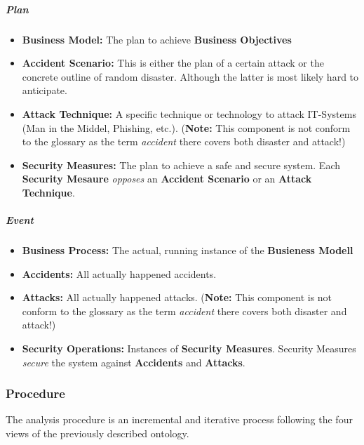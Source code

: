 \subparagraph{Plan}

\begin{itemize}
\itemsep1pt\parskip0pt
\item
  \textbf{Business Model:} The plan to achieve \textbf{Business
  Objectives}
\item
  \textbf{Accident Scenario:} This is either the plan of a certain
  attack or the concrete outline of random disaster. Although the latter
  is most likely hard to anticipate.
\item
  \textbf{Attack Technique:} A specific technique or technology to
  attack IT-Systems (Man in the Middel, Phishing, etc.). (\textbf{Note:}
  This component is not conform to the glossary as the term
  \emph{accident} there covers both disaster and attack!)
\item
  \textbf{Security Measures:} The plan to achieve a safe and secure
  system. Each \textbf{Security Mesaure} \emph{opposes} an
  \textbf{Accident Scenario} or an \textbf{Attack Technique}.
\end{itemize}

\subparagraph{Event}

\begin{itemize}
\itemsep1pt\parskip0pt
\item
  \textbf{Business Process:} The actual, running instance of the
  \textbf{Busieness Modell}
\item
  \textbf{Accidents:} All actually happened accidents.
\item
  \textbf{Attacks:} All actually happened attacks. (\textbf{Note:} This
  component is not conform to the glossary as the term \emph{accident}
  there covers both disaster and attack!)
\item
  \textbf{Security Operations:} Instances of \textbf{Security Measures}.
  Security Measures \emph{secure} the system against \textbf{Accidents}
  and \textbf{Attacks}.
\end{itemize}

\subsubsection{Procedure}

The analysis procedure is an incremental and iterative process following
the four views of the previously described ontology.



